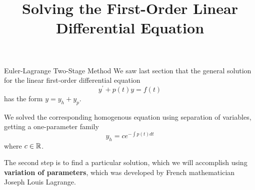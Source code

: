 \documentclass{beamer}
\title[MATH 2250 - Section 2.2]{Solving the First-Order Linear Differential Equation}
\begin{document}
\begin{frame}
\titlepage
\end{frame}

\begin{frame}
\begin{block}{Euler-Lagrange Two-Stage Method}
We saw last section that the general solution for the linear first-order differential equation
\begin{equation*}
y^\prime+p(t) y = f(t)
\end{equation*}
has the form $y=y_h+y_p$.\pause

\vspace{2mm}
We solved the corresponding homogenous equation using separation of variables, getting a one-parameter family
\begin{equation*}
y_h=c e^{-\int p(t) dt}
\end{equation*}
where $c\in\mathbb{R}$.\pause

\vspace{2mm}
The second step is to find a particular solution, which we will accomplish using \textbf{variation of parameters}, which was developed by French mathematician Joseph Louis Lagrange.
\end{block}
\end{frame}
\end{document}
